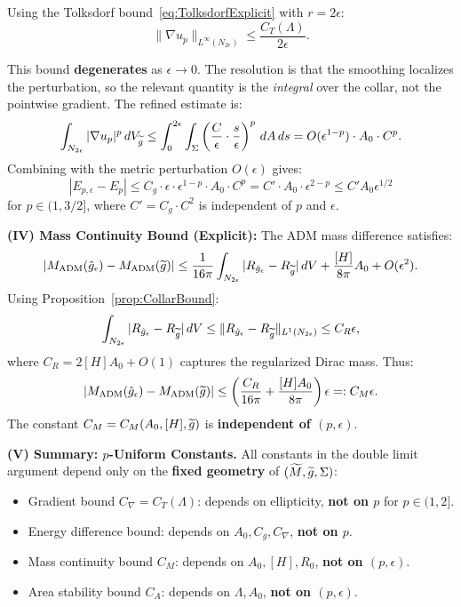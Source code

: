 \begin{remark}
Using the Tolksdorf bound~\eqref{eq:TolksdorfExplicit} with $r = 2\epsilon$:
\begin{equation}
    \|\nabla u_p\|_{L^\infty(N_{2\epsilon})} \le \frac{C_T(\Lambda)}{2\epsilon}.
\end{equation}

This bound \textbf{degenerates} as $\epsilon \to 0$. The resolution is that the smoothing localizes the perturbation, so the relevant quantity is the \emph{integral} over the collar, not the pointwise gradient. The refined estimate is:
\begin{equation}
    \int_{N_{2\epsilon}} |\nabla u_p|^p \, dV_{\widetilde{g}} \le \int_0^{2\epsilon} \int_\Sigma \left( \frac{C}{\epsilon} \cdot \frac{s}{\epsilon} \right)^p \, dA \, ds = O(\epsilon^{1-p}) \cdot A_0 \cdot C^p.
\end{equation}
Combining with the metric perturbation $O(\epsilon)$ gives:
\begin{equation}
    |E_{p,\epsilon} - E_p| \le C_g \cdot \epsilon \cdot \epsilon^{1-p} \cdot A_0 \cdot C^p = C' \cdot A_0 \cdot \epsilon^{2-p} \le C' A_0 \epsilon^{1/2}
\end{equation}
for $p \in (1, 3/2]$, where $C' = C_g \cdot C^2$ is independent of $p$ and $\epsilon$.

\textbf{(IV) Mass Continuity Bound (Explicit):}
The ADM mass difference satisfies:
\begin{equation}
    |M_{\mathrm{ADM}}(\hat{g}_\epsilon) - M_{\mathrm{ADM}}(\widetilde{g})| \le \frac{1}{16\pi} \int_{N_{2\epsilon}} |R_{\hat{g}_\epsilon} - R_{\widetilde{g}}| \, dV + \frac{[H]}{8\pi} A_0 + O(\epsilon^2).
\end{equation}
Using Proposition~\ref{prop:CollarBound}:
\begin{equation}
    \int_{N_{2\epsilon}} |R_{\hat{g}_\epsilon} - R_{\widetilde{g}}| \, dV \le \|R_{\hat{g}_\epsilon} - R_{\widetilde{g}}\|_{L^1(N_{2\epsilon})} \le C_R \epsilon,
\end{equation}
where $C_R = 2[H] A_0 + O(1)$ captures the regularized Dirac mass. Thus:
\begin{equation}
    |M_{\mathrm{ADM}}(\hat{g}_\epsilon) - M_{\mathrm{ADM}}(\widetilde{g})| \le \left( \frac{C_R}{16\pi} + \frac{[H] A_0}{8\pi} \right) \epsilon =: C_M \epsilon.
\end{equation}
The constant $C_M = C_M(A_0, [H], \widetilde{g})$ is \textbf{independent of $(p, \epsilon)$}.

\textbf{(V) Summary: $p$-Uniform Constants.}
All constants in the double limit argument depend only on the \textbf{fixed geometry} of $(\widetilde{M}, \widetilde{g}, \Sigma)$:
\begin{itemize}
    \item Gradient bound $C_\nabla = C_T(\Lambda)$: depends on ellipticity, \textbf{not on $p$} for $p \in (1, 2]$.
    \item Energy difference bound: depends on $A_0, C_g, C_\nabla$, \textbf{not on $p$}.
    \item Mass continuity bound $C_M$: depends on $A_0, [H], R_0$, \textbf{not on $(p, \epsilon)$}.
    \item Area stability bound $C_A$: depends on $\Lambda, A_0$, \textbf{not on $(p, \epsilon)$}.
\end{itemize}


\end{remark}
